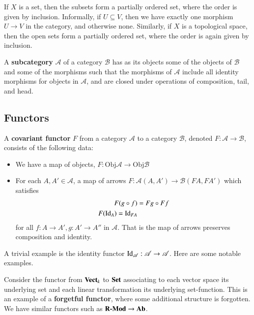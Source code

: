 \begin{example}
    If $X$ is a set, then the subsets form a partially ordered set, where the order is given by inclusion. Informally, if $U \subseteq V$, then we have exactly one morphism $U\rightarrow V$ in the category, and otherwise none. Similarly, if $X$ is a topological space, then the open sets form a partially ordered set, where the order is again given by inclusion.
\end{example}

\begin{definition}
    A \textbf{subcategory} $\mathscr{A}$ of a category $\mathscr{B}$ has as its objects some of the objects of $\mathscr{B}$ and some of the morphisms such that the morphisms of $\mathscr{A}$ include all identity morphisms for objects in $\mathscr{A}$, and are closed under operations of composition, tail, and head. 
\end{definition}

\subsection{Functors}

A \textbf{covariant functor} $F$ from a category $\mathscr{A}$ to a category $\mathscr{B}$, denoted $F:\mathscr{A}\rightarrow \mathscr{B}$, consists of the following data: \begin{itemize}
    \item We have a map of objects, $F:\text{Obj}\mathscr{A}\rightarrow \text{Obj}\mathscr{B}$
    \item For each $A,A' \in \mathscr{A}$, a map of arrows $F:\mathscr{A}(A,A')\rightarrow \mathscr{B}(FA,FA')$ which satisfies \begin{align*}
            F(g\circ f) &= Fg\circ Ff \\
            F(\operatorname{Id}_A) = \operatorname{Id}_{FA}
    \end{align*}
        for all $f:A\rightarrow A', g:A'\rightarrow A''$ in $\mathscr{A}$. That is the map of arrows preserves composition and identity.
\end{itemize}

A trivial example is the identity functor $\operatorname{Id}_{\mathscr{A}}:\mathscr{A}\rightarrow \mathscr{A}$. Here are some notable examples.

\begin{example}
    Consider the functor from $\normalfont\textbf{Vect}_{k}$ to $\normalfont\textbf{Set}$ associating to each vector space its underlying set and each linear transformation its underlying set-function. This is an example of a \textbf{forgetful functor}, where some additional structure is forgotten. We have similar functors such as $\normalfont\textbf{R-Mod}\rightarrow \normalfont\textbf{Ab}$.
\end{example}


